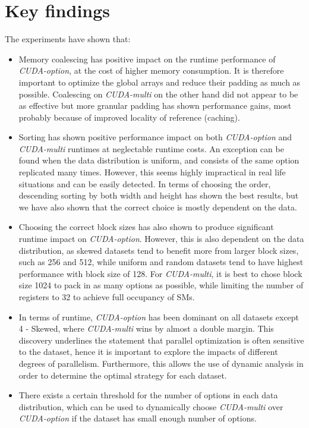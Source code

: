 \section{Key findings}
The experiments have shown that:
\begin{itemize}
    \item Memory coalescing has positive impact on the runtime performance of \textit{CUDA-option}, at the cost of higher memory consumption. It is therefore important to optimize the global arrays and reduce their padding as much as possible. Coalescing on \textit{CUDA-multi} on the other hand did not appear to be as effective but more granular padding has shown performance gains, most probably because of improved locality of reference (caching).    
    
    \item Sorting has shown positive performance impact on both \textit{CUDA-option} and \textit{CUDA-multi} runtimes at neglectable runtime costs. An exception can be found when the data distribution is uniform, and consists of the same option replicated many times. However, this seems highly impractical in real life situations and can be easily detected. In terms of choosing the order, descending sorting by both width and height has shown the best results, but we have also shown that the correct choice is mostly dependent on the data. 
    
    \item Choosing the correct block sizes has also shown to produce significant runtime impact on \textit{CUDA-option}. However, this is also dependent on the data distribution, as skewed datasets tend to benefit more from larger block sizes, such as 256 and 512, while uniform and random datasets tend to have highest performance with block size of 128. For \textit{CUDA-multi}, it is best to chose block size 1024 to pack in as many options as possible, while limiting the number of registers to 32 to achieve full occupancy of SMs.
    
    \item In terms of runtime, \textit{CUDA-option} has been dominant on all datasets except 4 - Skewed, where \textit{CUDA-multi} wins by almost a double margin. This discovery underlines the statement that parallel optimization is often sensitive to the dataset, hence it is important to explore the impacts of different degrees of parallelism. Furthermore, this allows the use of dynamic analysis in order to determine the optimal strategy for each dataset. 
    
    \item There exists a certain threshold for the number of options in each data distribution, which can be used to dynamically choose \textit{CUDA-multi} over \textit{CUDA-option} if the dataset has small enough number of options.  
\end{itemize} 

